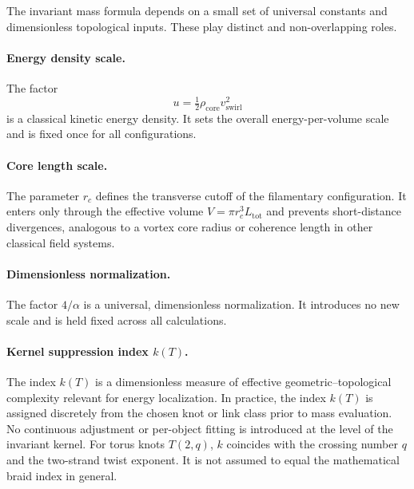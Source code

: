 \documentclass[11pt,a4paper]{article}
\begin{document}
            The invariant mass formula depends on a small set of universal constants
            and dimensionless topological inputs.
            These play distinct and non-overlapping roles.

            \paragraph{Energy density scale.}
                The factor
                \[
                    u = \tfrac12 \rho_{\mathrm{core}} v_{\mathrm{swirl}}^2
                \]
                is a classical kinetic energy density.
                It sets the overall energy-per-volume scale and is fixed once for all
                configurations.

            \paragraph{Core length scale.}
                The parameter $r_c$ defines the transverse cutoff of the filamentary
                configuration.
                It enters only through the effective volume
                $V = \pi r_c^3 L_{\mathrm{tot}}$ and prevents short-distance divergences,
                analogous to a vortex core radius or coherence length in other classical
                field systems.

            \paragraph{Dimensionless normalization.}
                The factor $4/\alpha$ is a universal, dimensionless normalization.
                It introduces no new scale and is held fixed across all calculations.

            \paragraph{Kernel suppression index $k(T)$.}
                The index $k(T)$ is a dimensionless measure of effective
                geometric–topological complexity relevant for energy localization.
                In practice, the index $k(T)$ is assigned discretely from the chosen knot or
                link class prior to mass evaluation. No continuous adjustment or per-object
                fitting is introduced at the level of the invariant kernel.
                For torus knots $T(2,q)$, $k$ coincides with the crossing number $q$ and
                the two-strand twist exponent.
                It is not assumed to equal the mathematical braid index in general.
\end{document}
